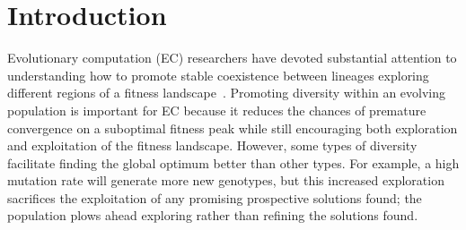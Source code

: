 \section{Introduction}

Evolutionary computation (EC) researchers have devoted substantial attention to understanding how to promote stable coexistence between lineages %
exploring different regions of a fitness landscape~\cite{goldberg_genetic_1987,mahfoud_niching_1995, mouret_using_2009,pugh_confronting_2015}. %
Promoting diversity within an evolving population is important for EC because it reduces the chances of premature convergence on a suboptimal fitness peak while still encouraging both exploration and exploitation of the fitness landscape. However, some types of diversity facilitate finding the global optimum better than other types. For example, a high mutation rate will generate more new genotypes, but this increased exploration sacrifices the exploitation of any promising prospective solutions found; the population plows ahead exploring rather than refining the solutions found.

